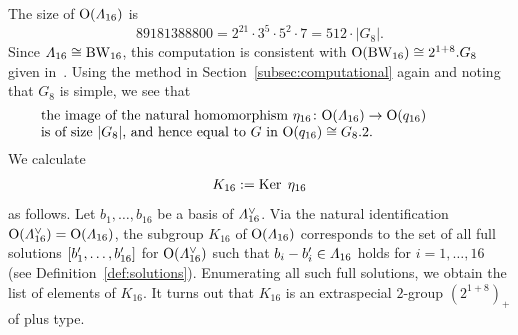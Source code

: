 \documentclass{amsart} %
\begin{document}
%
%
%
 The size of $\mathord{\mathrm{O}}(\varLambda_{16})$ is
 \[
 89181388800=2^{21}\cdot 3^5\cdot 5^2\cdot 7=512\cdot |G_8|.
 \]
 Since $\varLambda_{16}\cong \mathrm{BW}_{16}$, 
this computation is consistent with $\mathord{\mathrm{O}}(\mathrm{BW}_{16})\cong 2^{1+8}.G_8$
given in~\cite[Chapter 4, Section 10]{theCSbook}.
Using the method in Section~\ref{subsec:computational} again
and noting that $G_8$ is simple,
we see that 
%
\begin{equation}\label{eq:Imageeta16}
\parbox{11cm}{
\textrm{%
the image of 
the natural homomorphism $\eta_{16}\colon \OG(\Lamsxtn)\to \OG(q_{16})$ \\
 is of size $|G_8|$, and hence 
equal to $G$ in $\OG(q_{16})\cong G_8.2$.
}
}
\end{equation}
%
%
We calculate
\[
K_{16}:=\operatorname{Ker} \;\eta_{16}
\]
as follows.
Let $b_1, \dots, b_{16}$ be a basis of $\varLambda_{16}^{\vee}$.
Via the 
natural identification $\mathord{\mathrm{O}}(\varLambda_{16}^{\vee})=\mathord{\mathrm{O}}( \varLambda_{16})$,
the subgroup
$K_{16}$ of $\mathord{\mathrm{O}}( \varLambda_{16})$
corresponds to the set of 
all full solutions $[b_1^{\prime}, \dots, b_{16}^{\prime}]$ for $\mathord{\mathrm{O}}( \varLambda_{16}^{\vee})$
such that $b_i-b_i^{\prime}\in \varLambda_{16}$ holds for $i=1, \dots, 16$
(see Definition~\ref{def:solutions}).
Enumerating all such full solutions,
we obtain the list of elements of $K_{16}$.
It turns out that 
$K_{16}$ is an extraspecial $2$-group $(2^{1+8})_{+}$ of plus type.
%
%
%
\end{document}
